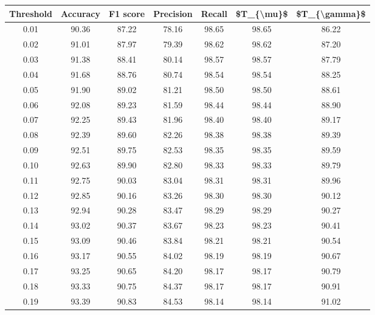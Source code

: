 \begin{tabular}{|c|c|c|c|c|c|c|}
\hline
 Threshold &  Accuracy &  F1 score &  Precision &  Recall &  \$T\_\{\textbackslash mu\}\$ &  \$T\_\{\textbackslash gamma\}\$ \\
\hline
      0.01 &     90.36 &     87.22 &      78.16 &   98.65 &      98.65 &         86.22 \\
      0.02 &     91.01 &     87.97 &      79.39 &   98.62 &      98.62 &         87.20 \\
      0.03 &     91.38 &     88.41 &      80.14 &   98.57 &      98.57 &         87.79 \\
      0.04 &     91.68 &     88.76 &      80.74 &   98.54 &      98.54 &         88.25 \\
      0.05 &     91.90 &     89.02 &      81.21 &   98.50 &      98.50 &         88.61 \\
      0.06 &     92.08 &     89.23 &      81.59 &   98.44 &      98.44 &         88.90 \\
      0.07 &     92.25 &     89.43 &      81.96 &   98.40 &      98.40 &         89.17 \\
      0.08 &     92.39 &     89.60 &      82.26 &   98.38 &      98.38 &         89.39 \\
      0.09 &     92.51 &     89.75 &      82.53 &   98.35 &      98.35 &         89.59 \\
      0.10 &     92.63 &     89.90 &      82.80 &   98.33 &      98.33 &         89.79 \\
      0.11 &     92.75 &     90.03 &      83.04 &   98.31 &      98.31 &         89.96 \\
      0.12 &     92.85 &     90.16 &      83.26 &   98.30 &      98.30 &         90.12 \\
      0.13 &     92.94 &     90.28 &      83.47 &   98.29 &      98.29 &         90.27 \\
      0.14 &     93.02 &     90.37 &      83.67 &   98.23 &      98.23 &         90.41 \\
      0.15 &     93.09 &     90.46 &      83.84 &   98.21 &      98.21 &         90.54 \\
      0.16 &     93.17 &     90.55 &      84.02 &   98.19 &      98.19 &         90.67 \\
      0.17 &     93.25 &     90.65 &      84.20 &   98.17 &      98.17 &         90.79 \\
      0.18 &     93.33 &     90.75 &      84.37 &   98.17 &      98.17 &         90.91 \\
      0.19 &     93.39 &     90.83 &      84.53 &   98.14 &      98.14 &         91.02 \\

\end{tabular}
